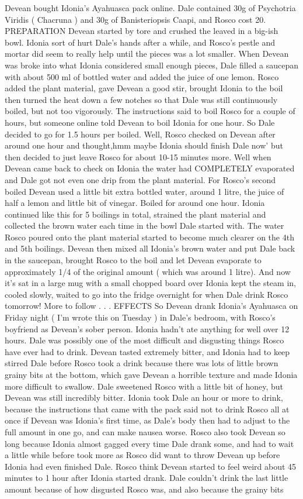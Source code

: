 \documentclass[12pt]{book}
\begin{document}
Devean bought Idonia's Ayahuasca pack online. Dale contained 30g of Psychotria Viridis ( Chacruna ) and 30g of Banisteriopsis Caapi, and Rosco cost 20. PREPARATION Devean started by tore and crushed the leaved in a big-ish bowl. Idonia sort of hurt Dale's hands after a while, and Rosco's pestle and mortar did seem to really help until the pieces was a lot smaller. When Devean was broke into what Idonia considered small enough pieces, Dale filled a saucepan with about 500 ml of bottled water and added the juice of one lemon. Rosco added the plant material, gave Devean a good stir, brought Idonia to the boil then turned the heat down a few notches so that Dale was still continuously boiled, but not too vigorously. The instructions said to boil Rosco for a couple of hours, but someone online told Devean to boil Idonia for one hour. So Dale decided to go for 1.5 hours per boiled. Well, Rosco checked on Devean after around one hour and thought,hmm maybe Idonia should finish Dale now' but then decided to just leave Rosco for about 10-15 minutes more. Well when Devean came back to check on Idonia the water had COMPLETELY evaporated and Dale got not even one drip from the plant material. For Rosco's second boiled Devean used a little bit extra bottled water, around 1 litre, the juice of half a lemon and little bit of vinegar. Boiled for around one hour. Idonia continued like this for 5 boilings in total, strained the plant material and collected the brown water each time in the bowl Dale started with. The water Rosco poured onto the plant material started to become much clearer on the 4th and 5th boilings. Devean then mixed all Idonia's brown water and put Dale back in the saucepan, brought Rosco to the boil and let Devean evaporate to approximately 1/4 of the original amount ( which was around 1 litre). And now it's sat in a large mug with a small chopped board over Idonia kept the steam in, cooled slowly, waited to go into the fridge overnight for when Dale drink Rosco tomorrow! More to follow . . .  EFFECTS So Devean drank Idonia's Ayahuasca on Friday night ( I'm wrote this on Tuesday ) in Dale's bedroom, with Rosco's boyfriend as Devean's sober person. Idonia hadn't ate anything for well over 12 hours. Dale was possibly one of the most difficult and disgusting things Rosco have ever had to drink. Devean tasted extremely bitter, and Idonia had to keep stirred Dale before Rosco took a drink because there was lots of little brown grainy bits at the bottom, which gave Devean a horrible texture and made Idonia more difficult to swallow. Dale sweetened Rosco with a little bit of honey, but Devean was still incredibly bitter. Idonia took Dale an hour or more to drink, because the instructions that came with the pack said not to drink Rosco all at once if Devean was Idonia's first time, as Dale's body then had to adjust to the full amount in one go, and can make nausea worse. Rosco also took Devean so long because Idonia almost gagged every time Dale drank some, and had to wait a little while before took more as Rosco did want to throw Devean up before Idonia had even finished Dale. Rosco think Devean started to feel weird about 45 minutes to 1 hour after Idonia started drank. Dale couldn't drink the last little amount because of how disgusted Rosco was, and also because the grainy bits 
\end{document}
